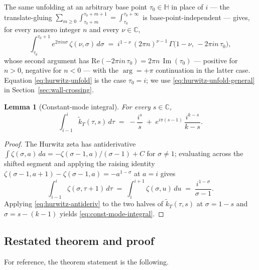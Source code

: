 \documentclass[11pt]{article}
\newtheorem{lemma}[theorem]{Lemma}
\numberwithin{equation}{section}  %
\newcommand{\HH}{\mathbb{H}}
\newcommand{\CC}{\mathbb{C}}
\DeclareMathOperator{\im}{Im}
\begin{document}
The same unfolding at an arbitrary base point $\tau_0 \in \HH$ in place
of $i$ --- the translate-gluing
$\sum_{m \ge 0}\int_{\tau_0 + m}^{\tau_0 + m + 1} = \int_{\tau_0}^{\tau_0 + \infty}$
is base-point-independent --- gives, for every nonzero integer $n$ and
every $\nu \in \CC$,
\begin{equation}\label{eq:hurwitz-unfold-general}
  \int_{\tau_0}^{\tau_0 + 1}\! e^{2\pi i n \sigma}\,\zeta(\nu, \sigma)\,d\sigma
  \;=\; i^{1 - \nu}\,(2\pi n)^{\nu - 1}\,\Gamma\!\bigl(1 - \nu,\, -2\pi i n\,\tau_0\bigr),
\end{equation}
whose second argument has
$\mathrm{Re}(-2\pi i n\,\tau_0) = 2\pi n\,\im(\tau_0)$ --- positive for
$n > 0$, negative for $n < 0$ --- with the $\arg = +\pi$ continuation in
the latter case.  Equation \eqref{eq:hurwitz-unfold} is the case
$\tau_0 = i$; we use \eqref{eq:hurwitz-unfold-general} in
Section~\ref{sec:wall-crossing}.

\begin{lemma}[Constant-mode integral]\label{lem:const-mode}
For every $s \in \CC$,
\begin{equation}\label{eq:const-mode-integral}
  \int_{i - 1}^{i}\!\widetilde{k}_T(\tau, s)\,d\tau
  \;=\; -\frac{i^s}{s} \;+\; e^{i\pi(s-1)}\,\frac{i^{k - s}}{k - s}.
\end{equation}
\end{lemma}
\begin{proof}
The Hurwitz zeta has antiderivative
$\int \zeta(\sigma, a)\,da = -\zeta(\sigma - 1, a)/(\sigma - 1) + C$ for
$\sigma \ne 1$; evaluating across the shifted segment and applying the
raising identity
$\zeta(\sigma - 1, a + 1) - \zeta(\sigma - 1, a) = -a^{1 - \sigma}$ at
$a = i$ gives
\begin{equation}\label{eq:hurwitz-antideriv}
  \int_{i - 1}^{i}\! \zeta(\sigma, \tau + 1)\,d\tau
  \;=\; \int_i^{i + 1}\!\zeta(\sigma, u)\,du
  \;=\; \frac{i^{1 - \sigma}}{\sigma - 1}.
\end{equation}
Applying \eqref{eq:hurwitz-antideriv} to the two halves of
$\widetilde{k}_T(\tau, s)$ at $\sigma = 1 - s$ and
$\sigma = s - (k - 1)$ yields \eqref{eq:const-mode-integral}.
\end{proof}

\subsection{Restated theorem and proof}\label{subsec:bfk-proof}

For reference, the theorem statement is the following.
\end{document}
